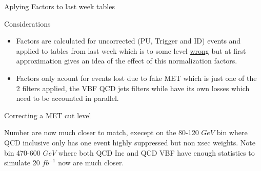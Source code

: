 \documentclass[8pt]{beamer}
\begin{document}
\begin{frame}{Aplying Factors to last week tables}

Considerations
\begin{itemize}
  \item Factors are calculated for uncorrected (PU, Trigger and ID) events and applied to tables from last week which
        is to some level \uline{wrong} but at first approximation gives an idea of the effect of this normalization factors.
  \item Factors only acount for events lost due to fake MET which is just one of the 2 filters applied, the VBF QCD jets filters
        while have its own losses which need to be accounted in parallel.
\end{itemize}

\begin{block}{Correcting a MET cut level}


\end{block}

Number are now much closer to match, execept on the 80-120 $GeV$ bin where QCD inclusive only has one event highly suppressed but non xsec weights. 
Note bin 470-600 $GeV$ where both QCD Inc and QCD VBF have enough statistics to simulate 20 $fb^{-1}$ now are much closer.


\end{frame}
\end{document}

